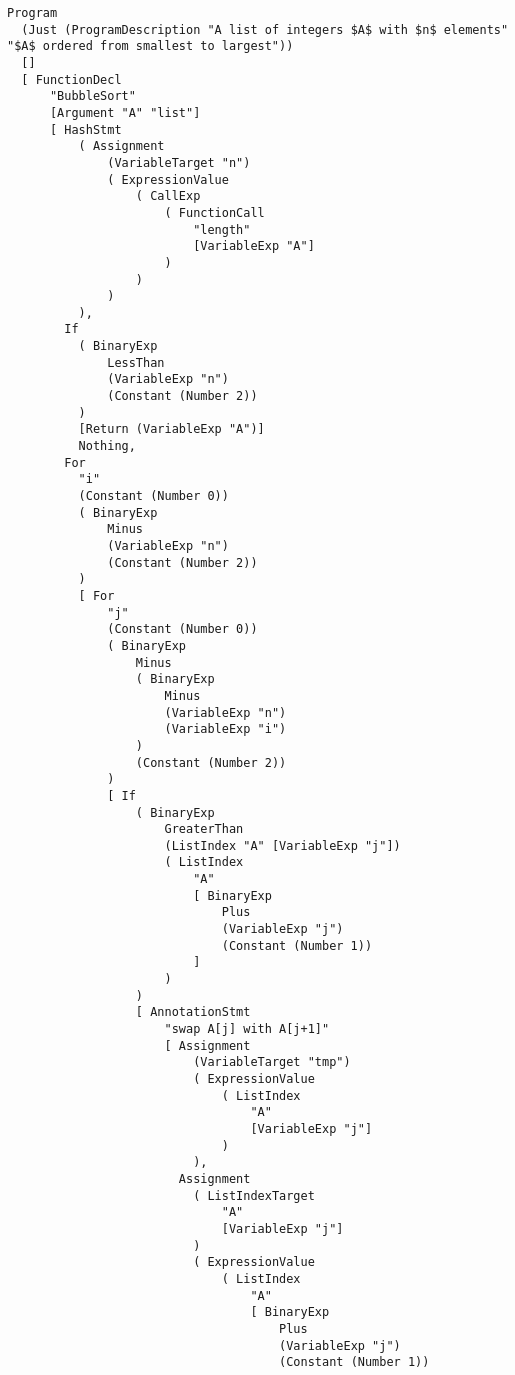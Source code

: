 \begin{lstlisting}
Program
  (Just (ProgramDescription "A list of integers $A$ with $n$ elements" "$A$ ordered from smallest to largest"))
  []
  [ FunctionDecl
      "BubbleSort"
      [Argument "A" "list"]
      [ HashStmt
          ( Assignment
              (VariableTarget "n")
              ( ExpressionValue
                  ( CallExp
                      ( FunctionCall
                          "length"
                          [VariableExp "A"]
                      )
                  )
              )
          ),
        If
          ( BinaryExp
              LessThan
              (VariableExp "n")
              (Constant (Number 2))
          )
          [Return (VariableExp "A")]
          Nothing,
        For
          "i"
          (Constant (Number 0))
          ( BinaryExp
              Minus
              (VariableExp "n")
              (Constant (Number 2))
          )
          [ For
              "j"
              (Constant (Number 0))
              ( BinaryExp
                  Minus
                  ( BinaryExp
                      Minus
                      (VariableExp "n")
                      (VariableExp "i")
                  )
                  (Constant (Number 2))
              )
              [ If
                  ( BinaryExp
                      GreaterThan
                      (ListIndex "A" [VariableExp "j"])
                      ( ListIndex
                          "A"
                          [ BinaryExp
                              Plus
                              (VariableExp "j")
                              (Constant (Number 1))
                          ]
                      )
                  )
                  [ AnnotationStmt
                      "swap A[j] with A[j+1]"
                      [ Assignment
                          (VariableTarget "tmp")
                          ( ExpressionValue
                              ( ListIndex
                                  "A"
                                  [VariableExp "j"]
                              )
                          ),
                        Assignment
                          ( ListIndexTarget
                              "A"
                              [VariableExp "j"]
                          )
                          ( ExpressionValue
                              ( ListIndex
                                  "A"
                                  [ BinaryExp
                                      Plus
                                      (VariableExp "j")
                                      (Constant (Number 1))

\end{lstlisting}
